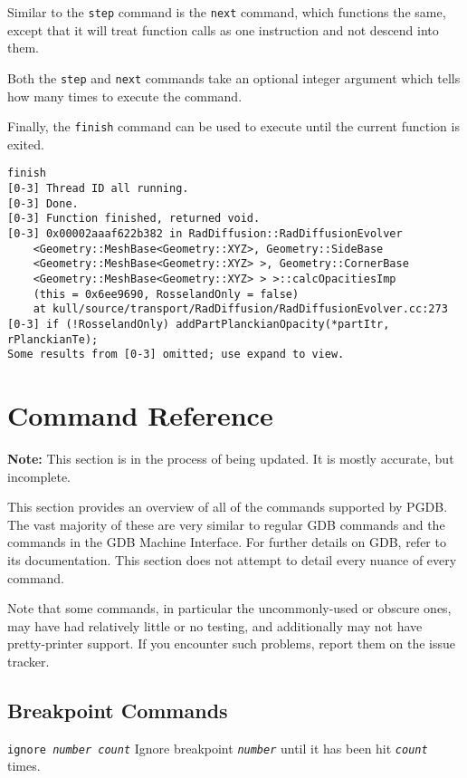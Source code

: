\documentclass{refart}
\newcommand{\lmargintt}[1]{\marginlabel{\texttt{#1}} \index{#1}}
\newcommand{\ttemph}[1]{\texttt{\emph{#1}}}
\begin{document}
Similar to the \texttt{step} command is the \texttt{next} command, which functions the same, except that it will treat function calls as one instruction and not descend into them.

Both the \texttt{step} and \texttt{next} commands take an optional integer argument which tells how many times to execute the command.

Finally, the \texttt{finish} command can be used to execute until the current function is exited.

\begin{Verbatim}
finish
[0-3] Thread ID all running.
[0-3] Done.
[0-3] Function finished, returned void.
[0-3] 0x00002aaaf622b382 in RadDiffusion::RadDiffusionEvolver
    <Geometry::MeshBase<Geometry::XYZ>, Geometry::SideBase
    <Geometry::MeshBase<Geometry::XYZ> >, Geometry::CornerBase
    <Geometry::MeshBase<Geometry::XYZ> > >::calcOpacitiesImp
    (this = 0x6ee9690, RosselandOnly = false)
    at kull/source/transport/RadDiffusion/RadDiffusionEvolver.cc:273
[0-3] if (!RosselandOnly) addPartPlanckianOpacity(*partItr, rPlanckianTe);
Some results from [0-3] omitted; use expand to view.
\end{Verbatim}

\newpage

\section{Command Reference}

\textbf{Note:} This section is in the process of being updated. It is mostly accurate, but incomplete.

This section provides an overview of all of the commands supported by PGDB. The vast majority of these are very similar to regular GDB commands and the commands in the GDB Machine Interface. For further details on GDB, refer to its documentation. This section does not attempt to detail every nuance of every command.

Note that some commands, in particular the uncommonly-used or obscure ones, may have had relatively little or no testing, and additionally may not have pretty-printer support. If you encounter such problems, report them on the issue tracker.

\subsection{Breakpoint Commands}

\lmargintt{ignore}
\texttt{ignore \emph{number} \emph{count}} \newline
Ignore breakpoint \ttemph{number} until it has been hit \ttemph{count} times.
\end{document}
